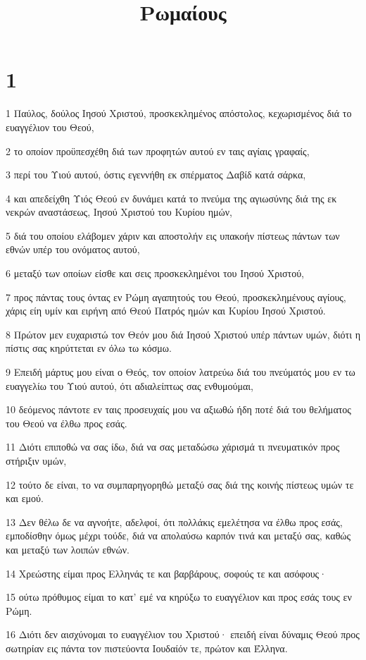 

\title{Ρωμαίους}


\chapter{1}

\par 1 Παύλος, δούλος Ιησού Χριστού, προσκεκλημένος απόστολος, κεχωρισμένος διά το ευαγγέλιον του Θεού,
\par 2 το οποίον προϋπεσχέθη διά των προφητών αυτού εν ταις αγίαις γραφαίς,
\par 3 περί του Υιού αυτού, όστις εγεννήθη εκ σπέρματος Δαβίδ κατά σάρκα,
\par 4 και απεδείχθη Υιός Θεού εν δυνάμει κατά το πνεύμα της αγιωσύνης διά της εκ νεκρών αναστάσεως, Ιησού Χριστού του Κυρίου ημών,
\par 5 διά του οποίου ελάβομεν χάριν και αποστολήν εις υπακοήν πίστεως πάντων των εθνών υπέρ του ονόματος αυτού,
\par 6 μεταξύ των οποίων είσθε και σεις προσκεκλημένοι του Ιησού Χριστού,
\par 7 προς πάντας τους όντας εν Ρώμη αγαπητούς του Θεού, προσκεκλημένους αγίους, χάρις είη υμίν και ειρήνη από Θεού Πατρός ημών και Κυρίου Ιησού Χριστού.
\par 8 Πρώτον μεν ευχαριστώ τον Θεόν μου διά Ιησού Χριστού υπέρ πάντων υμών, διότι η πίστις σας κηρύττεται εν όλω τω κόσμω.
\par 9 Επειδή μάρτυς μου είναι ο Θεός, τον οποίον λατρεύω διά του πνεύματός μου εν τω ευαγγελίω του Υιού αυτού, ότι αδιαλείπτως σας ενθυμούμαι,
\par 10 δεόμενος πάντοτε εν ταις προσευχαίς μου να αξιωθώ ήδη ποτέ διά του θελήματος του Θεού να έλθω προς εσάς.
\par 11 Διότι επιποθώ να σας ίδω, διά να σας μεταδώσω χάρισμά τι πνευματικόν προς στήριξιν υμών,
\par 12 τούτο δε είναι, το να συμπαρηγορηθώ μεταξύ σας διά της κοινής πίστεως υμών τε και εμού.
\par 13 Δεν θέλω δε να αγνοήτε, αδελφοί, ότι πολλάκις εμελέτησα να έλθω προς εσάς, εμποδίσθην όμως μέχρι τούδε, διά να απολαύσω καρπόν τινά και μεταξύ σας, καθώς και μεταξύ των λοιπών εθνών.
\par 14 Χρεώστης είμαι προς Ελληνάς τε και βαρβάρους, σοφούς τε και ασόφους·
\par 15 ούτω πρόθυμος είμαι το κατ' εμέ να κηρύξω το ευαγγέλιον και προς εσάς τους εν Ρώμη.
\par 16 Διότι δεν αισχύνομαι το ευαγγέλιον του Χριστού· επειδή είναι δύναμις Θεού προς σωτηρίαν εις πάντα τον πιστεύοντα Ιουδαίόν τε, πρώτον και Έλληνα.
